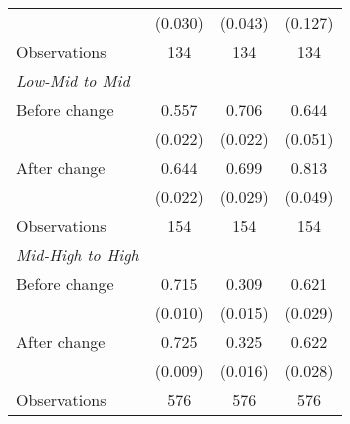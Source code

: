 \begin{center}
\begin{threeparttable}[!h]
\begin{tabular}{lccc}
                    &     (0.030)         &     (0.043)         &     (0.127)         \\
Observations        &         134         &         134         &         134         \\
\midrule\textit{Low-Mid to Mid} \\
\hspace{3mm}Before change&       0.557\sym{***}&       0.706\sym{***}&       0.644\sym{***}\\
                    &     (0.022)         &     (0.022)         &     (0.051)         \\
\hspace{3mm}After change&       0.644\sym{***}&       0.699\sym{***}&       0.813\sym{***}\\
                    &     (0.022)         &     (0.029)         &     (0.049)         \\
Observations        &         154         &         154         &         154         \\
\midrule\textit{Mid-High to High} \\
\hspace{3mm}Before change&       0.715\sym{***}&       0.309\sym{***}&       0.621\sym{***}\\
                    &     (0.010)         &     (0.015)         &     (0.029)         \\
\hspace{3mm}After change&       0.725\sym{***}&       0.325\sym{***}&       0.622\sym{***}\\
                    &     (0.009)         &     (0.016)         &     (0.028)         \\
Observations        &         576         &         576         &         576         \\
\bottomrule
\bottomrule
\end{tabular}
\end{threeparttable}
\end{center}
